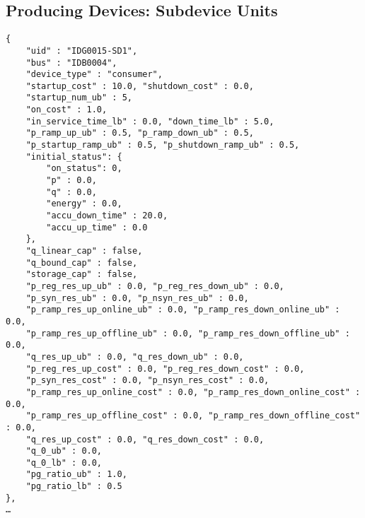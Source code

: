 \subsection{Producing Devices: Subdevice Units}
\label{sec:subdevice}


\begin{verbatim}
{
    "uid" : "IDG0015-SD1",
    "bus" : "IDB0004",
    "device_type" : "consumer",
    "startup_cost" : 10.0, "shutdown_cost" : 0.0,
    "startup_num_ub" : 5,
    "on_cost" : 1.0,
    "in_service_time_lb" : 0.0, "down_time_lb" : 5.0,
    "p_ramp_up_ub" : 0.5, "p_ramp_down_ub" : 0.5, 
    "p_startup_ramp_ub" : 0.5, "p_shutdown_ramp_ub" : 0.5,
    "initial_status": {
        "on_status": 0,
        "p" : 0.0,
        "q" : 0.0,
        "energy" : 0.0,
        "accu_down_time" : 20.0,
        "accu_up_time" : 0.0
    },
    "q_linear_cap" : false, 
    "q_bound_cap" : false, 
    "storage_cap" : false,
    "p_reg_res_up_ub" : 0.0, "p_reg_res_down_ub" : 0.0,
    "p_syn_res_ub" : 0.0, "p_nsyn_res_ub" : 0.0, 
    "p_ramp_res_up_online_ub" : 0.0, "p_ramp_res_down_online_ub" : 0.0,
    "p_ramp_res_up_offline_ub" : 0.0, "p_ramp_res_down_offline_ub" : 0.0,
    "q_res_up_ub" : 0.0, "q_res_down_ub" : 0.0,
    "p_reg_res_up_cost" : 0.0, "p_reg_res_down_cost" : 0.0,
    "p_syn_res_cost" : 0.0, "p_nsyn_res_cost" : 0.0, 
    "p_ramp_res_up_online_cost" : 0.0, "p_ramp_res_down_online_cost" : 0.0,
    "p_ramp_res_up_offline_cost" : 0.0, "p_ramp_res_down_offline_cost" : 0.0,
    "q_res_up_cost" : 0.0, "q_res_down_cost" : 0.0,
    "q_0_ub" : 0.0,
    "q_0_lb" : 0.0,
    "pg_ratio_ub" : 1.0,
    "pg_ratio_lb" : 0.5    
},
…     
\end{verbatim}

